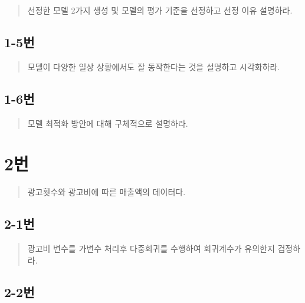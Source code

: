 \documentclass[
  letterpaper,
  DIV=11,
  numbers=noendperiod]{scrreprt}
\begin{document}

\begin{quote}
선정한 모델 2가지 생성 및 모델의 평가 기준을 선정하고 선정 이유
설명하라.
\end{quote}

\hypertarget{uxbc88-65}{%
\section*{1-5번}\label{uxbc88-65}}


\begin{quote}
모델이 다양한 일상 상황에서도 잘 동작한다는 것을 설명하고 시각화하라.
\end{quote}

\hypertarget{uxbc88-66}{%
\section*{1-6번}\label{uxbc88-66}}


\begin{quote}
모델 최적화 방안에 대해 구체적으로 설명하라.
\end{quote}

\hypertarget{uxbc88-67}{%
\chapter*{2번}\label{uxbc88-67}}


\begin{quote}
광고횟수와 광고비에 따른 매출액의 데이터다.
\end{quote}

\hypertarget{uxbc88-68}{%
\section*{2-1번}\label{uxbc88-68}}


\begin{quote}
광고비 변수를 가변수 처리후 다중회귀를 수행하여 회귀계수가 유의한지
검정하라.
\end{quote}

\hypertarget{uxbc88-69}{%
\section*{2-2번}\label{uxbc88-69}}
\end{document}
